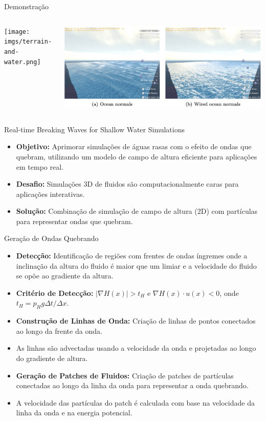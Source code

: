 \documentclass[aspectratio=169,xcolor=table]{beamer}
\begin{document}
\begin{frame}{Demonstração}
    \begin{columns}
        \centering
        \texttt{[image: imgs/terrain-and-water.png]}
        
        \centering
        \includegraphics[width=\textwidth]{imgs/terrain-and-water-2.png}
    \end{columns}
\end{frame}


\begin{frame}{Real-time Breaking Waves for Shallow Water Simulations}
        \begin{itemize}
        \item \textbf{Objetivo:} Aprimorar simulações de águas rasas com o efeito de ondas que quebram, utilizando um modelo de campo de altura eficiente para aplicações em tempo real.
        \item \textbf{Desafio:} Simulações 3D de fluidos são computacionalmente caras para aplicações interativas.
        \item \textbf{Solução:} Combinação de simulação de campo de altura (2D) com partículas para representar ondas que quebram.
    \end{itemize}
\end{frame}

\begin{frame}{Geração de Ondas Quebrando}
    \begin{itemize}
        \item \textbf{Detecção:} Identificação de regiões com frentes de ondas íngremes onde a inclinação da altura do fluido é maior que um limiar e a velocidade do fluido se opõe ao gradiente da altura.
        \item \textbf{Critério de Detecção:} $|\nabla H(x)| > t_H$ e $\nabla H(x) \cdot u(x) < 0$, onde $t_H = p_H g \Delta t / \Delta x$.
        \item \textbf{Construção de Linhas de Onda:} Criação de linhas de pontos conectados ao longo da frente da onda.
        \item As linhas são advectadas usando a velocidade da onda e projetadas ao longo do gradiente de altura.
        \item \textbf{Geração de Patches de Fluidos:} Criação de patches de partículas conectadas ao longo da linha da onda para representar a onda quebrando.
        \item A velocidade das partículas do patch é calculada com base na velocidade da linha da onda e na energia potencial.
    \end{itemize}
\end{frame}
\end{document}
